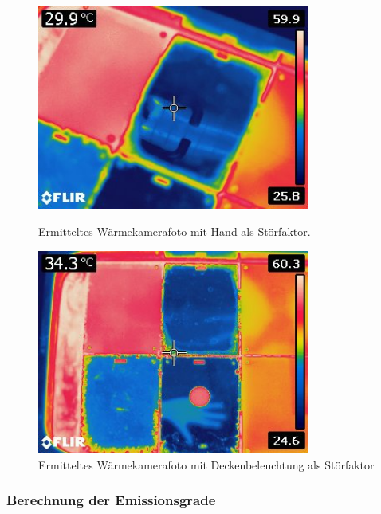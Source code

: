 \begin{figure}[H]
	\begin{minipage}{0.5\textwidth}
		\centering
		\includegraphics[width=0.8\textwidth]{../FLIR_100/FLIR2249.jpg}
		\caption[Ermitteltes Wärmekamerafoto mit Hand als Störfaktor]{Ermitteltes Wärmekamerafoto mit Hand als Störfaktor.}
		\label{fig:WBKHand}
	\end{minipage}\hfill
	\begin{minipage}{0.5\textwidth}
		\centering
		\includegraphics[width=0.8\textwidth]{../FLIR_100/FLIR2243.jpg}
		\caption[Ermitteltes Wärmekamerafoto mit Deckenbeleuchtung als Störfaktor]{Ermitteltes Wärmekamerafoto mit Deckenbeleuchtung als Störfaktor}
		\label{fig:WBKDecke}
	\end{minipage}
\end{figure}

\subsubsection{Berechnung der Emissionsgrade}

